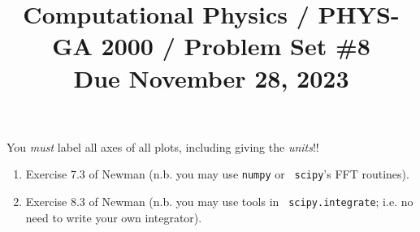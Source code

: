 \documentclass[11pt, preprint]{aastex}
\begin{document}
\title{\bf Computational Physics / PHYS-GA 2000 / Problem Set \#8
\\ Due November 28, 2023 }

You {\it must} label all axes of all plots, including giving the {\it
  units}!!

\begin{enumerate} 
\item Exercise 7.3 of Newman (n.b. you may use {\tt numpy} or {\tt
  scipy}'s FFT routines).
\item Exercise 8.3 of Newman (n.b. you may use tools in {\tt
  scipy.integrate}; i.e. no need to write your own integrator).
\end{enumerate} 
\end{document}
